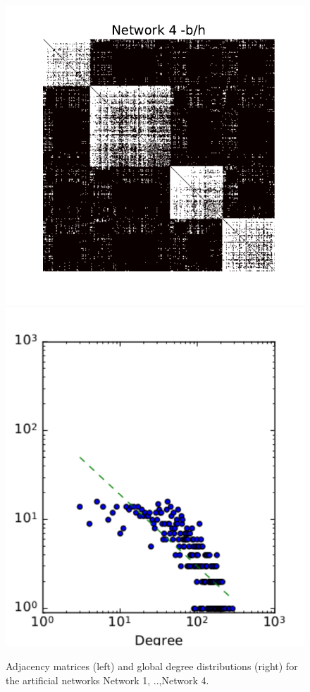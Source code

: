 \begin{figure}[h]
	\endminipage
	\vspace{-0.4cm}
	\includegraphics[scale=0.32]{img/g4}
	\endminipage
	\includegraphics[scale=0.32]{img/g4_d}
	\endminipage
	
	\caption{Adjacency matrices (left) and global degree distributions (right) for the artificial networks Network 1, ..,Network 4.}
	\label{fig:synt_graph}
\end{figure}

\vspace{1cm}
